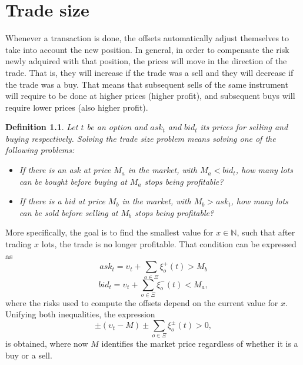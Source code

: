 \documentclass[10pt, a4paper, oneside]{article}
\newcommand{\N}{\ensuremath{\mathbb{N}}}
\def\ds{\displaystyle}
\newtheorem*{definition}{Definition}
\newcommand{\atm}{\ensuremath{\mathit{ATM}}}
\newcommand{\offsets}{\ensuremath{\Xi}}
\newcommand{\vega}{\ensuremath{\nu}}
\newcommand{\price}{\ensuremath{\upsilon}}
\begin{document}
\newcommand{\amountatmvegas}[1]{\ensuremath{\ds\frac{#1}{|\vega_{\atm(e)}|}}}
\thetaoffsetformula{\amountatmvegas{\vega_e}}{\amountatmvegas{\vega_t}}{SB}{\vega}








\chapter{Trade size}
Whenever a transaction is done, the offsets automatically adjust themselves to take into account the new position. In general, in order to compensate the risk newly adquired with that position, the prices will move in the direction of the trade.
That is, they will increase if the trade was a sell and they will decrease if the trade was a buy. That means that subsequent sells of the same instrument will require to be done at higher prices (higher profit), and subsequent buys will require 
lower prices (also higher profit).

\begin{definition}
 Let $t$ be an option and $\mathit{ask}_t$ and $\mathit{bid}_t$ its prices for selling and buying respectively. Solving the \emph{trade size} problem means solving one
 of the following problems:
 \vspace{-0.4cm}
 \begin{itemize}
  \item If there is an ask at price $M_a$ in the market, with $M_a < \mathit{bid}_t$, how many lots can be bought before buying at $M_a$ stops being profitable?
  \item If there is a bid at price $M_b$ in the market, with $M_b > \mathit{ask}_t$, how many lots can be sold before selling at $M_b$ stops being profitable?
 \end{itemize}
\end{definition}

\noindent More specifically, the goal is to find the smallest value for $x \in \N$, such that after trading $x$ lots, the trade is no longer profitable. That condition can be expressed as
\[\mathit{ask}_t=\price_t+\ds\sum_{o\in\offsets}\xi^+_o(t) > M_b\]
\[\mathit{bid}_t=\price_t+\ds\sum_{o\in\offsets}\xi^-_o(t) < M_a,\]
where the risks used to compute the offsets depend on the current value for $x$. Unifying both inequalities, the expression
\[\pm(\price_t-M) \pm\ds\sum_{o\in\offsets}\xi^{\pm}_o(t) > 0,\]
is obtained, where now $M$ identifies the market price regardless of whether it is a buy or a sell.
\end{document}
